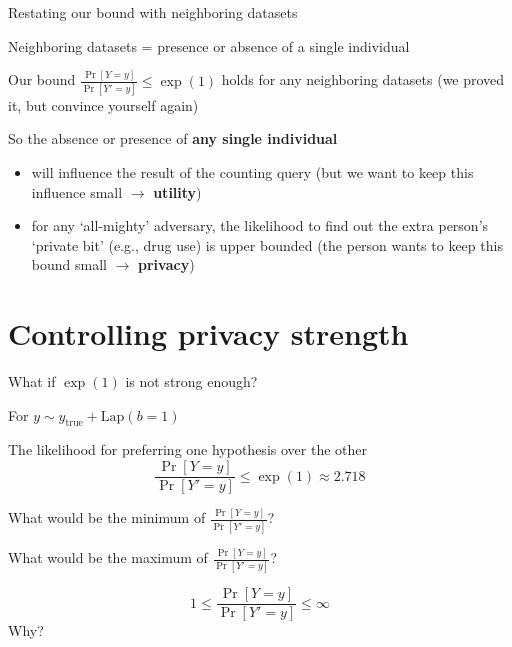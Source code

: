 \documentclass[12pt,aspectratio=169,handout]{beamer}
\begin{document}
\begin{frame}{Restating our bound with neighboring datasets}

Neighboring datasets = presence or absence of a single individual

Our bound $\frac{\Pr[Y = y]}{\Pr[Y' = y]} \leq \exp(1)$ holds for any neighboring datasets (we proved it, but convince yourself again)

So the absence or presence of \textbf{any single individual}
\begin{itemize}
	\item will influence the result of the counting query (but we want to keep this influence small $\rightarrow$ \textbf{utility})
	\item for any `all-mighty' adversary, the likelihood to find out the extra person's `private bit' (e.g., drug use) is upper bounded (the person wants to keep this bound small $\rightarrow$ \textbf{privacy})
\end{itemize}

\end{frame}



\section{Controlling privacy strength}

\begin{frame}{What if $\exp(1)$ is not strong enough?}

For $y \sim y_{\mathrm{true}} + \textrm{Lap}(b=1)$

The likelihood for preferring one hypothesis over the other	
$$
\frac{\Pr[Y = y]}{\Pr[Y' = y]} \leq \exp(1) \approx 2.718
$$

What would be the minimum of $\frac{\Pr[Y = y]}{\Pr[Y' = y]}$?

What would be the maximum of $\frac{\Pr[Y = y]}{\Pr[Y' = y]}$?

\pause

$$1 \leq \frac{\Pr[Y = y]}{\Pr[Y' = y]} \leq \infty$$
Why?

	
\end{frame}
\end{document}
